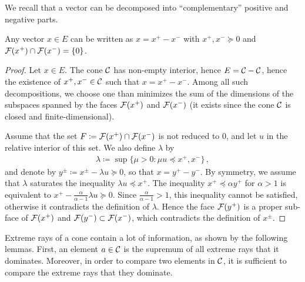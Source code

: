 \documentclass[main]{subfiles}
\begin{document}
We recall that a vector can be decomposed into \enquote{complementary} positive and negative parts.

\begin{lemma}
\label{lem:cone_decomp}
Any vector $x \in E$ can be written as $x = x^+ - x^-$ with $x^+, x^- \succeq 0$ and $\mathcal{F}(x^+) \cap \mathcal{F}(x^-) = \{0\}$.
\end{lemma}
\begin{proof}
Let $x \in E$.
The cone $\mathcal{C}$ has non-empty interior, hence $E = \mathcal{C} - \mathcal{C}$, hence the existence of $x^+, x^- \in \mathcal{C}$ such that $x = x^+ -x^-$.
Among all such decompositions, we choose one than minimizes the sum of the dimensions of the subspaces spanned by the faces $\mathcal{F}(x^+)$ and $\mathcal{F}(x^-)$ (it exists since the cone $\mathcal{C}$ is closed and finite-dimensional). 

Assume that the set $F \coloneqq \mathcal{F}(x^+) \cap \mathcal{F}(x^-)$ is not reduced to $0$, and let $u$ in the relative interior of this set. We also define $\lambda$ by
\begin{align*}
\lambda \coloneqq \sup \{ \mu > 0 \colon \mu u \preceq x^+, x^- \} \,,
\end{align*}
and denote by $y^\pm \coloneqq x^\pm - \lambda u \succeq 0$, so that $x = y^+ - y^-$. By symmetry, we assume that $\lambda$ saturates the inequality $\lambda u \preceq x^+$.
The inequality $x^+ \preceq \alpha y^+$ for  $\alpha > 1$ is equivalent to $x^+ - \frac{\alpha}{\alpha - 1}\lambda u \succeq 0$. Since $ \frac{\alpha}{\alpha - 1} > 1$, this inequality cannot be satisfied, otherwise it contradicts the definition of $\lambda$.
Hence the face $\mathcal{F}(y^+)$ is a proper sub-face of $\mathcal{F}(x^+)$ and $\mathcal{F}(y^-) \subset \mathcal{F}(x^-)$, which contradicts the definition of $x^\pm$.
\end{proof}

Extreme rays of a cone contain a lot of information, as shown by the following lemmas. First, an element $a \in \mathcal{C}$ is the supremum of all extreme rays that it dominates. Moreover, in order to compare two elements in $\mathcal{C}$, it is sufficient to compare the extreme rays that they dominate.

\end{document}
